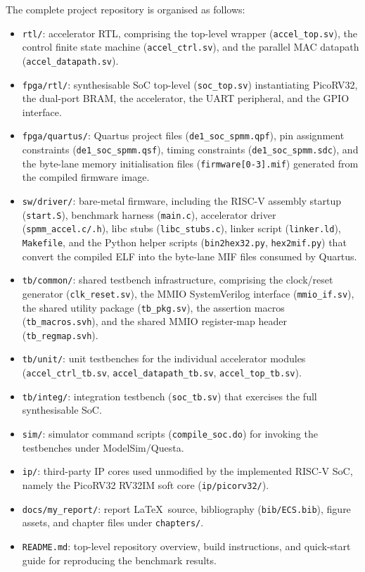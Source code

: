 \documentclass[oneside]{ecsproject}    %
\begin{document}
The complete project repository is organised as follows:
\begin{itemize}
  \item \texttt{rtl/}: accelerator RTL, comprising the top-level wrapper
        (\texttt{accel\_top.sv}), the control finite state machine
        (\texttt{accel\_ctrl.sv}), and the parallel MAC datapath
        (\texttt{accel\_datapath.sv}).
  \item \texttt{fpga/rtl/}: synthesisable SoC top-level
        (\texttt{soc\_top.sv}) instantiating PicoRV32, the dual-port BRAM,
        the accelerator, the UART peripheral, and the GPIO interface.
  \item \texttt{fpga/quartus/}: Quartus project files
        (\texttt{de1\_soc\_spmm.qpf}), pin assignment constraints
        (\texttt{de1\_soc\_spmm.qsf}), timing constraints
        (\texttt{de1\_soc\_spmm.sdc}), and the byte-lane memory
        initialisation files (\texttt{firmware[0-3].mif}) generated from
        the compiled firmware image.
  \item \texttt{sw/driver/}: bare-metal firmware, including the RISC-V
        assembly startup (\texttt{start.S}), benchmark harness
        (\texttt{main.c}), accelerator driver
        (\texttt{spmm\_accel.c/.h}), libc stubs
        (\texttt{libc\_stubs.c}), linker script (\texttt{linker.ld}),
        \texttt{Makefile}, and the Python helper scripts
        (\texttt{bin2hex32.py}, \texttt{hex2mif.py}) that convert the
        compiled ELF into the byte-lane MIF files consumed by Quartus.
  \item \texttt{tb/common/}: shared testbench infrastructure, comprising
        the clock/reset generator (\texttt{clk\_reset.sv}), the MMIO
        SystemVerilog interface (\texttt{mmio\_if.sv}), the shared
        utility package (\texttt{tb\_pkg.sv}), the assertion macros
        (\texttt{tb\_macros.svh}), and the shared MMIO register-map
        header (\texttt{tb\_regmap.svh}).
  \item \texttt{tb/unit/}: unit testbenches for the individual
        accelerator modules (\texttt{accel\_ctrl\_tb.sv},
        \texttt{accel\_datapath\_tb.sv}, \texttt{accel\_top\_tb.sv}).
  \item \texttt{tb/integ/}: integration testbench (\texttt{soc\_tb.sv})
        that exercises the full synthesisable SoC.
  \item \texttt{sim/}: simulator command scripts
        (\texttt{compile\_soc.do}) for invoking the testbenches under
        ModelSim/Questa.
  \item \texttt{ip/}: third-party IP cores used unmodified by the implemented
        RISC-V SoC, namely the PicoRV32 RV32IM soft core
        (\texttt{ip/picorv32/}).
  \item \texttt{docs/my\_report/}: report \LaTeX\ source, bibliography
        (\texttt{bib/ECS.bib}), figure assets, and chapter files under
        \texttt{chapters/}.
  \item \texttt{README.md}: top-level repository overview, build
        instructions, and quick-start guide for reproducing the
        benchmark results.
\end{itemize}
\end{document}
